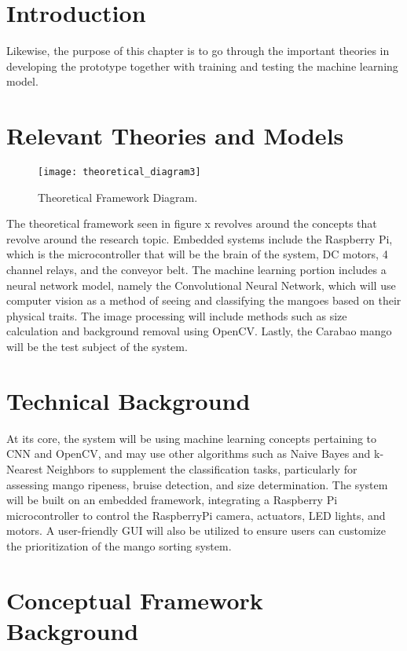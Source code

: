 

\section{Introduction}

Likewise, the purpose of this chapter is to go through the important theories in developing the prototype together with training and testing the machine learning model.

\section{Relevant Theories and Models}

\begin{figure}[!htbp]
	\centering
	\texttt{[image: theoretical\_diagram3]}
	\caption{Theoretical Framework Diagram.}
	\label{fig:theoreticalDiagram1}
\end{figure}


The theoretical framework seen in figure x revolves around the concepts that revolve around the research topic. 
Embedded systems include the Raspberry Pi, which is the microcontroller that will be the brain of the system, 
\gls{DC} motors, 4 channel relays, and the conveyor belt. The machine learning portion includes a neural network 
model, namely the Convolutional Neural Network, which will use computer vision as a method of seeing and classifying
 the mangoes based on their physical traits. The image processing will include methods such as size calculation and 
 background removal using OpenCV. Lastly, the Carabao mango will be the test subject of the system.

\section{Technical Background}

At its core, the system will be using machine learning concepts pertaining to \gls{CNN} and OpenCV, and may use other algorithms such as Naive Bayes and k-Nearest Neighbors to supplement the classification tasks, particularly for assessing mango ripeness, bruise detection, and size determination. The system will be built on an embedded framework, integrating a Raspberry Pi microcontroller to control the RaspberryPi camera, actuators, LED lights, and motors. A user-friendly GUI will also be utilized to ensure users can customize the prioritization of the mango sorting system.

\section{Conceptual Framework Background}


